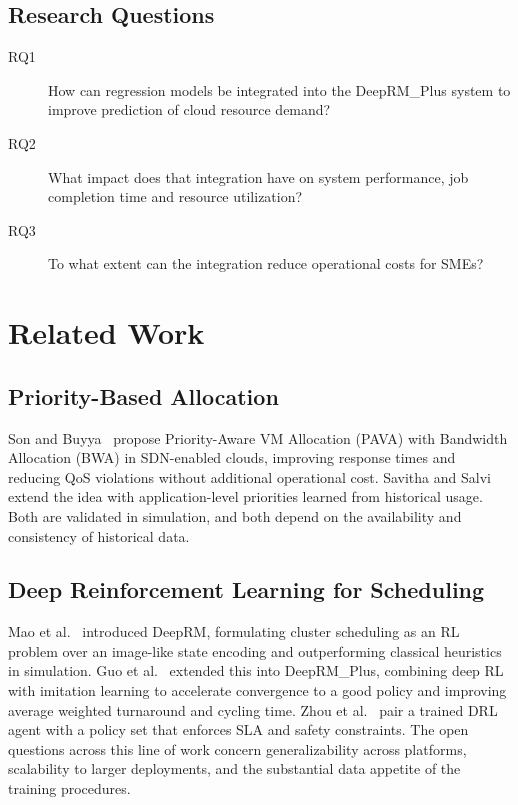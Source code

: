 \documentclass[runningheads]{llncs}
\begin{document}
\subsection{Research Questions}

\begin{description}
\item[RQ1] How can regression models be integrated into the
DeepRM\_Plus system to improve prediction of cloud resource demand?
\item[RQ2] What impact does that integration have on system
performance, job completion time and resource utilization?
\item[RQ3] To what extent can the integration reduce operational costs
for SMEs?
\end{description}

\section{Related Work}

\subsection{Priority-Based Allocation}

Son and Buyya~\cite{son2019} propose Priority-Aware VM Allocation
(PAVA) with Bandwidth Allocation (BWA) in SDN-enabled clouds,
improving response times and reducing QoS violations without
additional operational cost. Savitha and Salvi~\cite{savitha2021}
extend the idea with application-level priorities learned from
historical usage. Both are validated in simulation, and both depend on
the availability and consistency of historical data.

\subsection{Deep Reinforcement Learning for Scheduling}

Mao et al.~\cite{mao2016} introduced DeepRM, formulating cluster
scheduling as an RL problem over an image-like state encoding and
outperforming classical heuristics in simulation. Guo
et al.~\cite{guo2021} extended this into DeepRM\_Plus, combining deep
RL with imitation learning to accelerate convergence to a good policy
and improving average weighted turnaround and cycling time. Zhou
et al.~\cite{zhou2021} pair a trained DRL agent with a policy set that
enforces SLA and safety constraints. The open questions across this
line of work concern generalizability across platforms, scalability to
larger deployments, and the substantial data appetite of the training
procedures.
\end{document}
